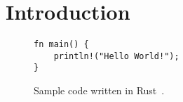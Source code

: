 \section*{Introduction}
\begin{figure}
\begin{verbatim}
fn main() {
	println!("Hello World!");
}
\end{verbatim}
\caption{Sample code written in Rust~\cite{matsakisRustLanguage2014}.}
\end{figure}